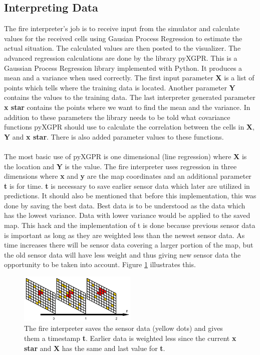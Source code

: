 \subsection{Interpreting Data}
The fire interpreter's job is to receive input from the simulator and 
calculate values for the received cells using Gausian Process Regression to estimate the actual situation. The calculated values are then posted to the visualizer. The advanced regression calculations are done by the library pyXGPR. This is a Gaussian Process Regression library implemented with Python. It produces a mean and a variance when used correctly. The first input parameter \textbf{X} is a list of points which tells where the training data is located. Another parameter \textbf{Y} contains the values to the training data. The last interpreter generated parameter \textbf{x star} contains the points where we want to find the mean and the variance. In addition to these parameters the library needs to be told what covariance functions pyXGPR should use to calculate the correlation between the cells in \textbf{X}, \textbf{Y} and \textbf{x star}. There is also added parameter values to these functions.
\\\\
The most basic use of pyXGPR is one dimensional (line regression) where \textbf{X} is the location and \textbf{Y} is the value. The fire interpreter uses regression in three dimensions where \textbf{x} and \textbf{y} are the map coordinates and an additional parameter \textbf{t} is for time. \textbf{t} is necessary to save earlier sensor data which later are utilized in predictions. It should also be mentioned that before this implementation, this was done by saving the best data. Best data is to be understood as the data which has the lowest variance. Data with lower variance would be applied to the saved map. This hack and the implementation of t is done because previous sensor data is important as long as they are weighted less than the newest sensor data. As time increases there will be sensor data covering a larger portion of the map, but the old sensor data will have less weight and thus giving new sensor data the opportunity to be taken into account. Figure \ref{fig:timeElapse} illustrates this.
\begin{figure}[here]
  \centering
      \includegraphics[width=0.5\textwidth]{solution/graphics/timeElapse.png}
  \caption{The fire interpreter saves the sensor data (yellow dots) and gives them a timestamp \textbf{t}. Earlier data is weighted less since the current \textbf{x star} and \textbf{X} has the same and last value for \textbf{t}. }
  \label{fig:timeElapse}
\end{figure}
